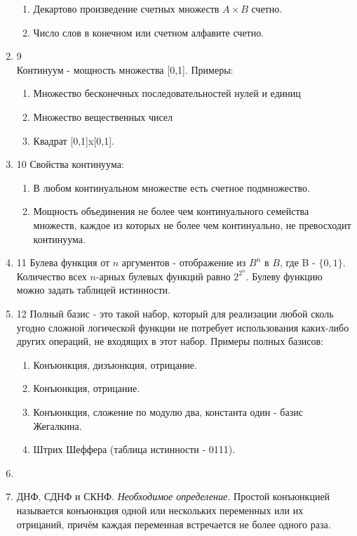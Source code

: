 \documentclass[a4paper,12pt]{article}
\begin{document}
\begin{enumerate}
\begin{enumerate}
			\item Декартово произведение счетных множеств $A \times B$ счетно.
			\item Число слов в конечном или счетном алфавите счетно.
		\end{enumerate}
		\item 9 \\
		Континуум - мощность множества [0,1]. Примеры:
		\begin{enumerate}
			\item Множество бесконечных последовательностей нулей и единиц
			\item Множество вещественных чисел
			\item Квадрат [0,1]x[0,1].
		\end{enumerate}
		\item 10
		Свойства континуума:
		\begin{enumerate}
		\item В любом континуальном множестве есть счетное подмножество.
		\item Мощность объединения не более чем континуального семейства множеств,
		каждое из которых не более чем континуально, не превосходит континуума.
		\end{enumerate}
		
		\item 11
		Булева функция от $n$ аргументов - отображение из $B^{n}$ в $B$, где B - $\{0,1\}$.
		Количество всех $n$-арных булевых функций равно $2^{2^{n}}$. Булеву функцию можно задать таблицей истинности.
		
		\item 12
		Полный базис - это такой набор, который для реализации любой сколь
		угодно сложной логической функции не потребует использования каких-либо других
		операций, не входящих в этот набор.
		Примеры полных базисов:

		\begin {enumerate}
		\item Конъюнкция, дизъюнкция, отрицание.
		\item Конъюнкция, отрицание.
		\item Конъюнкция, сложение по модулю два, константа один - базис Жегалкина.
		\item Штрих Шеффера (таблица истинности - 0111).
		\end {enumerate}
               
        \item

        \item ДНФ, СДНФ и СКНФ.
        \textit {Необходимое определение.} Простой конъюнкцией называется конъюнкция одной или нескольких переменных или их отрицаний, причём каждая переменная встречается не более одного раза.


\end{enumerate}
\end{document}
